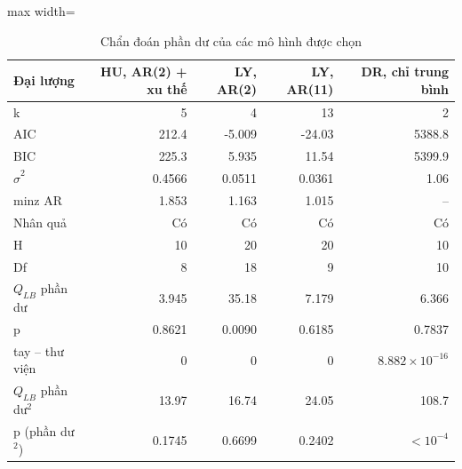 \begin{table}[H]
\centering\footnotesize
\caption{Chẩn đoán phần dư của các mô hình được chọn}\label{tab:tab_b11_14_residual_diagnostics}
\begin{adjustbox}{max width=\linewidth}
\begin{tabular}{|l|r|r|r|r|}
\toprule
Đại lượng & HU, AR(2) + xu thế & LY, AR(2) & LY, AR(11) & DR, chỉ trung bình \\
\midrule
k & 5 & 4 & 13 & 2 \\
AIC & 212.4 & -5.009 & -24.03 & 5388.8 \\
BIC & 225.3 & 5.935 & 11.54 & 5399.9 \\
$\hat{\sigma}^{2}$ & 0.4566 & 0.0511 & 0.0361 & 1.06 \\
min\textbar{}z\textbar{} AR & 1.853 & 1.163 & 1.015 & – \\
Nhân quả & Có & Có & Có & Có \\
H & 10 & 20 & 20 & 10 \\
Df & 8 & 18 & 9 & 10 \\
$Q_{LB}$ phần dư & 3.945 & 35.18 & 7.179 & 6.366 \\
p & 0.8621 & 0.0090 & 0.6185 & 0.7837 \\
\textbar{}tay – thư viện\textbar{} & 0 & 0 & 0 & $8.882\times10^{-16}$ \\
$Q_{LB}$ phần dư$^{2}$ & 13.97 & 16.74 & 24.05 & 108.7 \\
p (phần dư$^{2}$) & 0.1745 & 0.6699 & 0.2402 & $<10^{-4}$ \\
\bottomrule
\end{tabular}
\end{adjustbox}\par{}
\end{table}
